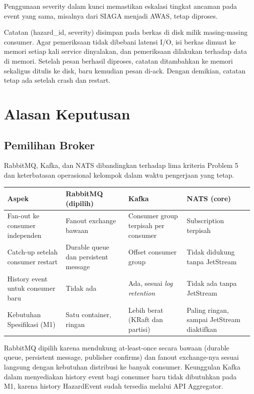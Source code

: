 Penggunaan severity dalam kunci memastikan eskalasi tingkat ancaman pada event yang sama, misalnya dari SIAGA menjadi AWAS, tetap diproses.

Catatan (hazard\_id, severity) disimpan pada berkas di disk milik masing-masing consumer. Agar pemeriksaan tidak dibebani latensi I/O, isi berkas dimuat ke memori setiap kali service dinyalakan, dan pemeriksaan dilakukan terhadap data di memori. Setelah pesan berhasil diproses, catatan ditambahkan ke memori sekaligus ditulis ke disk, baru kemudian pesan di-ack. Dengan demikian, catatan tetap ada setelah crash dan restart.

\section{Alasan Keputusan}

\subsection{Pemilihan Broker}

RabbitMQ, Kafka, dan NATS dibandingkan terhadap lima kriteria Problem 5 dan keterbatasan operasional kelompok dalam waktu pengerjaan yang tetap.

\begin{longtable}[]{|>{\raggedright\arraybackslash}p{\dimexpr(\linewidth-8\tabcolsep)/4\relax}|>{\raggedright\arraybackslash}p{\dimexpr(\linewidth-8\tabcolsep)/4\relax}|>{\raggedright\arraybackslash}p{\dimexpr(\linewidth-8\tabcolsep)/4\relax}|>{\raggedright\arraybackslash}p{\dimexpr(\linewidth-8\tabcolsep)/4\relax}|}
\hline
Aspek & RabbitMQ (dipilih) & Kafka & NATS (core) \\
\hline
\endhead
\endlastfoot
Fan-out ke consumer independen & Fanout exchange bawaan & Consumer group terpisah per consumer & Subscription terpisah \\
\hline
Catch-up setelah consumer restart & Durable queue dan persistent message & Offset consumer group & Tidak didukung tanpa JetStream \\
\hline
History event untuk consumer baru & Tidak ada & Ada, sesuai \textit{log retention} & Tidak ada tanpa JetStream \\
\hline
Kebutuhan Spesifikasi (M1) & Satu container, ringan & Lebih berat (KRaft dan partisi) & Paling ringan, sampai JetStream diaktifkan \\
\hline
\end{longtable}

RabbitMQ dipilih karena mendukung at-least-once secara bawaan (durable queue, persistent message, publisher confirms) dan fanout exchange-nya sesuai langsung dengan kebutuhan distribusi ke banyak consumer. Keunggulan Kafka dalam menyediakan history event bagi consumer baru tidak dibutuhkan pada M1, karena history HazardEvent sudah tersedia melalui API Aggregator.

